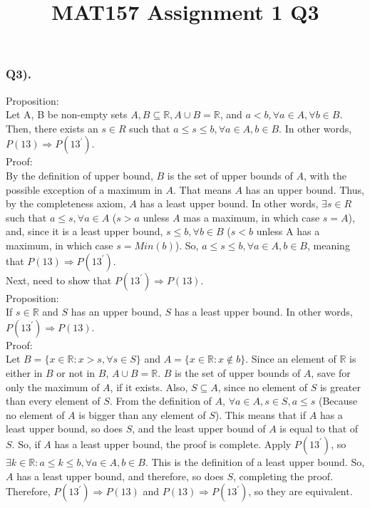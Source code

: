 \documentclass{article}
\title{MAT157 Assignment 1 Q3}
\begin{document}
\subsubsection*{Q3).}

{\large Proposition:}\\
 Let A, B be non-empty sets $A, B \subseteq \mathbb{R}, A \cup B = \mathbb{R}$, and $a < b, \forall a \in A, \forall b \in B$. Then, there exists an $s \in R$ such that $a \leq s \leq b, \forall a \in A, b \in B$. In other words, $P(13) \Rightarrow P(13^{'})$. \\

{\large Proof:}\\
By the definition of upper bound, $B$ is the set of upper bounds of $A$, with the possible exception of a maximum in $A$. That means $A$ has an upper bound. Thus, by the completeness axiom, $A$ has a least upper bound. In other words, $\exists s \in R$ such that  $a \leq s, \forall a \in A$ ($s > a$ unless $A$ mas a maximum, in which case $s=A$), and, since it is a least upper bound, $s \leq b, \forall b \in B$ ($s < b$ unless A has a maximum, in which case $s=Min(b)$). So, $a \leq s \leq b,  \forall a \in A, b \in B$, meaning that $P(13) \Rightarrow P(13^{'})$. \\
Next, need to show that $P(13^{'}) \Rightarrow P(13)$.\\

{\large Proposition:}\\
If $s \in \mathbb{R}$ and $S$ has an upper bound, $S$ has a least upper bound. In other words, $P(13^{'}) \Rightarrow P(13)$.  \\

{\large Proof:}\\
Let $B = \{x \in \mathbb{R} : x > s, \forall s \in S\}$ and $A = \{x \in \mathbb{R} : x \notin b\}$. Since an element of $\mathbb{R}$  is either in $B$ or not in $B$, $A \cup B = \mathbb{R}$. $B$ is the set of upper bounds of $A$, save for only the maximum of $A$, if it exists. Also, $S \subseteq A$, since no element of $S$ is greater than every element of $S$. From the definition of $A$, $\forall a \in A, s \in S,  a \leq s$ (Because no element of $A$ is bigger than any element of $S$). This means that if $A$ has a least upper bound, so does $S$, and the least upper bound of $A$ is equal to that of $S$. So, if $A$ has a least upper bound, the proof is complete. Apply $P(13^{'})$, so $\exists k \in \mathbb{R} : a \leq k \leq b, \forall a \in A, b \in B$. This is the definition of a least upper bound. So, $A$ has a least upper bound, and therefore, so does $S$, completing the proof. \\
Therefore, $P(13^{'}) \Rightarrow P(13)$ and $P(13) \Rightarrow P(13^{'})$, so they are equivalent.
\end{document}
